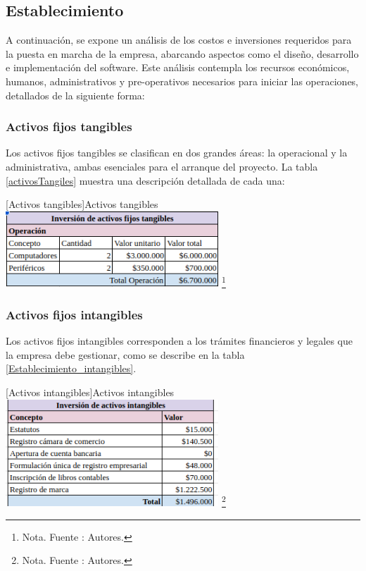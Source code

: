 \subsection{Establecimiento}

A continuación, se expone un análisis de los costos e inversiones requeridos para la puesta en marcha de la empresa, abarcando aspectos como el diseño, desarrollo e implementación del software. Este análisis contempla los recursos económicos, humanos, administrativos y pre-operativos necesarios para iniciar las operaciones, detallados de la siguiente forma:

\subsubsection{Activos fijos tangibles}

Los activos fijos tangibles se clasifican en dos grandes áreas: la operacional y la administrativa, ambas esenciales para el arranque del proyecto. La tabla \ref{activosTangiles} muestra una descripción detallada de cada una:

    \vspace{2mm}
        \begin{minipage}{0.9\textwidth}
        \centering
        [{Activos tangibles}]{Activos tangibles}
        \label{activosTangiles}
        \includegraphics[width=0.6\textwidth]{Content/Images/AF/Establecimiento_tangibles.png}
        \footnote{Nota. \textup{Fuente : Autores.}}
        \end{minipage}

\subsubsection{Activos fijos intangibles}

Los activos fijos intangibles corresponden a los trámites financieros y legales que la empresa debe gestionar, como se describe en la tabla \ref{Establecimiento_intangibles}.

\vspace{2mm}
        \begin{minipage}{0.9\textwidth}
        \centering
        [{Activos intangibles}]{Activos intangibles}
        \label{Establecimiento_intangibles}
        \includegraphics[width=0.6\textwidth]{Content/Images/AF/Establecimiento_intangibles.png}
        \footnote{Nota. \textup{Fuente : Autores.}}
        \end{minipage}

